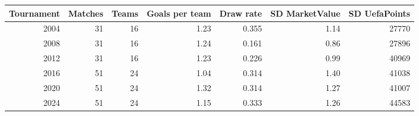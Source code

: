 
\begin{tabular}{rrrrrrr}
\toprule
Tournament & Matches & Teams & Goals per team & Draw rate & SD MarketValue & SD UefaPoints\\
\midrule
2004 & 31 & 16 & 1.23 & 0.355 & 1.14 & 27770\\
2008 & 31 & 16 & 1.24 & 0.161 & 0.86 & 27896\\
2012 & 31 & 16 & 1.23 & 0.226 & 0.99 & 40969\\
2016 & 51 & 24 & 1.04 & 0.314 & 1.40 & 41038\\
2020 & 51 & 24 & 1.32 & 0.314 & 1.27 & 41007\\
2024 & 51 & 24 & 1.15 & 0.333 & 1.26 & 44583\\
\bottomrule
\end{tabular}
